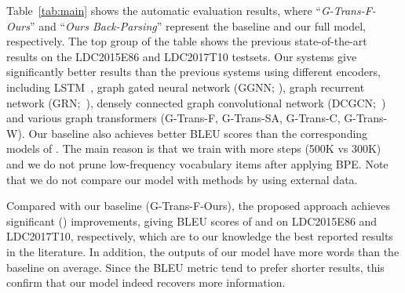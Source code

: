\documentclass[11pt,a4paper]{article}
\begin{document}
Table~\ref{tab:main} shows the automatic evaluation results, where ``\emph{G-Trans-F-Ours}'' and ``\emph{Ours Back-Parsing}'' represent the baseline and our full model, respectively.
The top group of the table shows the previous state-of-the-art results on the LDC2015E86 and LDC2017T10 testsets.
Our systems give significantly better results than the previous systems using different encoders, including 
LSTM~\cite{konstas2017neural}, 
graph gated neural network (GGNN; \citealp{beck2018graph}), graph recurrent network (GRN;~\citealp{song2018graph}), densely connected graph convolutional network (DCGCN;~\citealp{guo-etal-2019-densely}) and various graph transformers (G-Trans-F, G-Trans-SA, G-Trans-C, G-Trans-W). 
Our baseline also achieves better BLEU scores than the corresponding models of \citet{zhu2019modeling}.
The main reason is that we train with more steps (500K vs 300K) and we do not prune low-frequency vocabulary items after applying BPE. 
Note that we do not compare our model with methods by using external data.



Compared with our baseline (G-Trans-F-Ours), 
the proposed approach achieves significant () improvements, giving BLEU scores of  and  on LDC2015E86 and LDC2017T10, respectively, which are to our knowledge the best reported results in the literature.
In addition, the outputs of our model have  more words than the baseline on average.
Since the BLEU metric tend to prefer shorter results, this confirm that our model indeed recovers more information.
\end{document}
